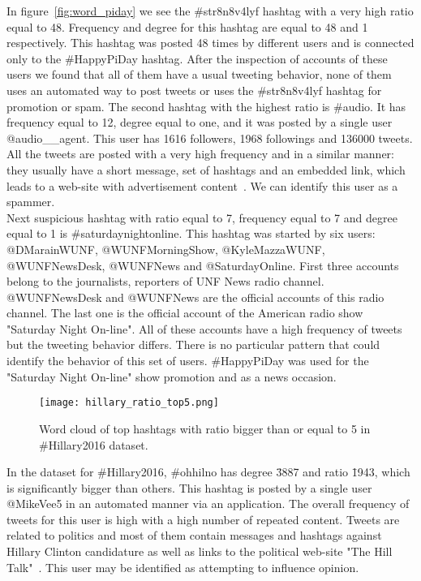 \documentclass[journal, a4paper, 12pt]{article}
\begin{document}
In figure~\ref{fig:word_piday} we see the \#str8n8v4lyf hashtag with a very high ratio equal to 48. Frequency and degree for this hashtag are equal to 48 and 1 respectively. This hashtag was posted 48 times by different users and is connected only to the \#HappyPiDay hashtag. After the inspection of accounts of these users we found that all of them have a usual tweeting behavior, none of them uses an automated way to post tweets or uses the \#str8n8v4lyf hashtag for promotion or spam. The second hashtag with the highest ratio is \#audio. It has frequency equal to 12, degree equal to one, and it was posted by a single user @audio\_\_agent. This user has 1616 followers, 1968 followings and 136000 tweets. All the tweets are posted with a very high frequency and in a similar manner: they usually have a short message, set of hashtags and an embedded link, which leads to a web-site with advertisement content~\cite{dragplus_audio}. We can identify this user as a spammer. \\

Next suspicious hashtag with ratio equal to 7, frequency equal to 7 and degree equal to 1 is \#saturdaynightonline. This hashtag was started by six users: @DMarainWUNF, @WUNFMorningShow, @KyleMazzaWUNF, @WUNFNewsDesk, @WUNFNews and @SaturdayOnline. First three accounts belong to the journalists, reporters of UNF News radio channel. @WUNFNewsDesk and @WUNFNews are the official accounts of this radio channel. The last one is the official account of the American radio show "Saturday Night On-line".  All of these accounts have a high frequency of tweets but the tweeting behavior differs. There is no particular pattern that could identify the behavior of this set of users. \#HappyPiDay was used for the "Saturday Night On-line" show promotion and as a news occasion.\\


   \begin{figure}[!hbt]
		\begin{center}
		\texttt{[image: hillary\_ratio\_top5.png]}
		\caption{Word cloud of top hashtags with ratio bigger than or equal to 5 in \#Hillary2016 dataset.}
		\label{fig:word_hillary}
		\end{center}
	\end{figure}
    

In the dataset for \#Hillary2016, \#ohhilno has degree \= 3887 and ratio \= 1943, which is significantly bigger than others. This hashtag is posted by a single user @MikeVee5 in an automated manner via an application. The overall frequency of tweets for this user is high with a high number of repeated content. Tweets are related to politics and most of them contain messages and hashtags against Hillary Clinton candidature as well as links to the political web-site "The Hill Talk"~\cite{thehilltalk}. This user may be identified as attempting to influence opinion. \\ 
\end{document}
